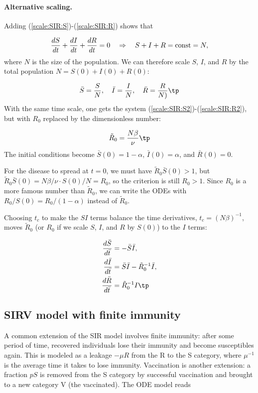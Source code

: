 \documentclass[graybox,envcountchap,sectrefs,final]{svmonodo}
\begin{document}
\paragraph{Alternative scaling.}
Adding (\ref{scale:SIR:S})-(\ref{scale:SIR:R}) shows that

\[ \frac{dS}{dt}+\frac{dI}{dt}+\frac{dR}{dt}=0\quad\Rightarrow\quad
S+I+R=\hbox{const}=N,\]
where $N$ is the size of the population.
We can therefore scale $S$, $I$, and $R$ by the total
population $N=S(0)+I(0)+R(0)$:

\[ \bar S = \frac{S}{N},\quad \bar I = \frac{I}{N},\quad
\bar R = \frac{R}{N)}\tp
\]
With the same time scale, one gets the system (\ref{scale:SIR:S2})-(\ref{scale:SIR:R2}), but with $R_0$ replaced by the dimensionless number:

\begin{equation}
\tilde R_0 = \frac{N\beta}{\nu}\tp
\end{equation}
The initial conditions become $\bar S(0)=1-\alpha$, $\bar I(0)=\alpha$,
and $\bar R(0)=0$.

For the disease to spread at $t=0$, we must have $\tilde R_0 \bar S(0) > 1$,
but $\tilde R_0 \bar S(0) = N\beta/\nu \cdot S(0)/N = R_0$, so the
criterion is still $R_0 > 1$. Since $R_0$ is a more famous number than
$\tilde R_0$, we can write the ODEs with $R_0/S(0) = R_0/(1-\alpha)$
instead of $\tilde R_0$.

Choosing $t_c$ to make the $SI$ terms balance the time derivatives,
$t_c = (N\beta)^{-1}$, moves $\tilde R_0$ (or $R_0$ if we scale
$S$, $I$, and $R$ by $S(0)$) to the $I$ terms:

\begin{align*}
\frac{d\bar S}{d\bar t} &= - \bar S\bar I,
\\ 
\frac{d\bar I}{d\bar t} &= \bar S\bar I - \tilde R_0^{-1} \bar I,
\\ 
\frac{d\bar R}{d\bar t} &= \tilde R_0^{-1} I\tp
\end{align*}

\subsection{SIRV model with finite immunity}

A common extension of the SIR model involves finite immunity: after
some period of time, recovered individuals lose their immunity
and become susceptibles again. This is modeled as
a leakage $-\mu R$ from the R to the S category, where $\mu^{-1}$
is the average time it takes to lose immunity.
Vaccination is another extension: a fraction $pS$ is removed from the
S category by successful vaccination and brought to a new category V (the
vaccinated). The ODE model reads
\end{document}
